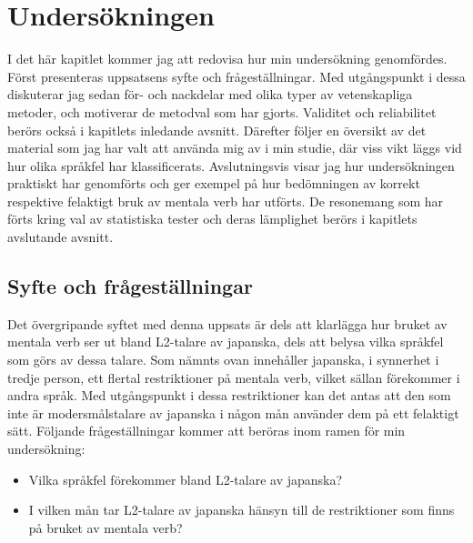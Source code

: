 \documentclass[12pt,a4paper]{article}
\begin{document}
\newpage
\section{Undersökningen}
\label{ch:Undersökningen}
I det här kapitlet kommer jag att redovisa hur min undersökning genomfördes. Först presenteras uppsatsens syfte och frågeställningar. Med utgångspunkt i dessa diskuterar jag sedan för- och nackdelar med olika typer av vetenskapliga metoder, och motiverar de metodval som har gjorts. Validitet och reliabilitet berörs också i kapitlets inledande avsnitt. Därefter följer en översikt av det material som jag har valt att använda mig av i min studie, där viss vikt läggs vid hur olika språkfel har klassificerats. Avslutningsvis visar jag hur undersökningen praktiskt har genomförts och ger exempel på hur bedömningen av korrekt respektive felaktigt bruk av mentala verb har utförts. De resonemang som har förts kring val av statistiska tester och deras lämplighet berörs i kapitlets avslutande avsnitt.

\subsection{Syfte och frågeställningar}
\label{sec:Undersökningen: Syfte och frågeställningar}
Det övergripande syftet med denna uppsats är dels att klarlägga hur bruket av mentala verb ser ut bland L2-talare av japanska, dels att belysa vilka språkfel som görs av dessa talare. Som nämnts ovan innehåller japanska, i synnerhet i tredje person, ett flertal restriktioner på mentala verb, vilket sällan förekommer i andra språk. Med utgångspunkt i dessa restriktioner kan det antas att den som inte är modersmålstalare av japanska i någon mån använder dem på ett felaktigt sätt. Följande frågeställningar kommer att beröras inom ramen för min undersökning:

\begin{itemize}
\item Vilka språkfel förekommer bland L2-talare av japanska?
\item I vilken mån tar L2-talare av japanska hänsyn till de restriktioner som finns på bruket av mentala verb?
\end{itemize}

\end{document}
